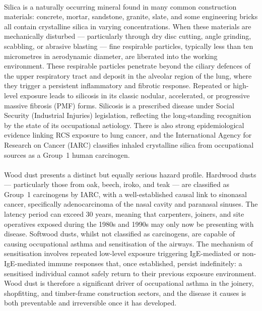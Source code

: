 \paragraph{}
Silica is a naturally occurring mineral found in many common construction materials: concrete, mortar, sandstone, granite, slate, and some engineering bricks all contain crystalline silica in varying concentrations. When these materials are mechanically disturbed --- particularly through dry disc cutting, angle grinding, scabbling, or abrasive blasting --- fine respirable particles, typically less than ten micrometres in aerodynamic diameter, are liberated into the working environment. These respirable particles penetrate beyond the ciliary defences of the upper respiratory tract and deposit in the alveolar region of the lung, where they trigger a persistent inflammatory and fibrotic response. Repeated or high-level exposure leads to silicosis in its classic nodular, accelerated, or progressive massive fibrosis (PMF) forms. Silicosis is a prescribed disease under Social Security (Industrial Injuries) legislation, reflecting the long-standing recognition by the state of its occupational aetiology. There is also strong epidemiological evidence linking RCS exposure to lung cancer, and the International Agency for Research on Cancer (IARC) classifies inhaled crystalline silica from occupational sources as a Group~1 human carcinogen.

\paragraph{}
Wood dust presents a distinct but equally serious hazard profile. Hardwood dusts --- particularly those from oak, beech, iroko, and teak --- are classified as Group~1 carcinogens by IARC, with a well-established causal link to sinonasal cancer, specifically adenocarcinoma of the nasal cavity and paranasal sinuses. The latency period can exceed 30 years, meaning that carpenters, joiners, and site operatives exposed during the 1980s and 1990s may only now be presenting with disease. Softwood dusts, whilst not classified as carcinogens, are capable of causing occupational asthma and sensitisation of the airways. The mechanism of sensitisation involves repeated low-level exposure triggering IgE-mediated or non-IgE-mediated immune responses that, once established, persist indefinitely: a sensitised individual cannot safely return to their previous exposure environment. Wood dust is therefore a significant driver of occupational asthma in the joinery, shopfitting, and timber-frame construction sectors, and the disease it causes is both preventable and irreversible once it has developed.

